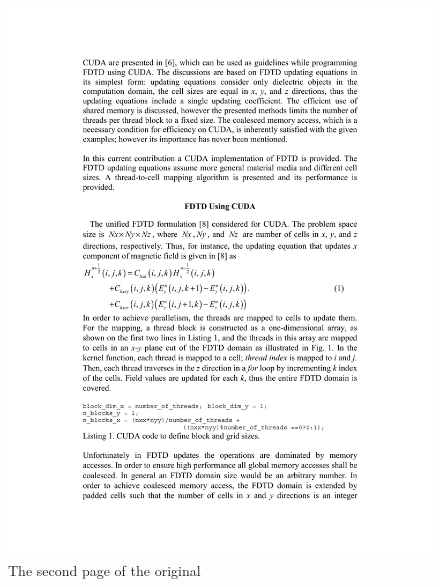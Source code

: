 \begin{figure}[h]
	\centering
	\includegraphics[width=1\linewidth]{../pics/p02}
	\caption{The second page of the original}
	\label{fig:p02}
\end{figure}

